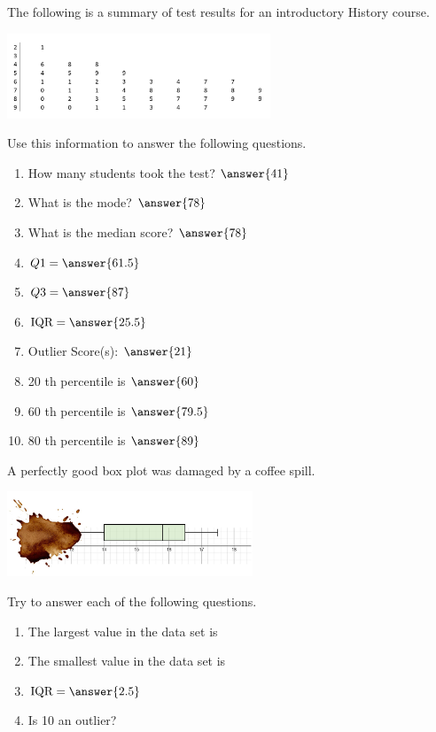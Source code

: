 \documentclass{ximera}
\begin{document}
\begin{problem}\label{prob:140hom2prob4}
The following is a summary of test results for an introductory History course.
\begin{image}
   \includegraphics[height=1in]{140H2pic10.jpg}
 \end{image}
 
 Use this information to answer the following questions.
 
 \begin{enumerate}
     \item How many students took the test? $\answer{41}$
     \item What is the mode? $\answer{78}$
     \item What is the median score? $\answer{78}$
     \item $Q1=\answer{61.5}$
     \item $Q3=\answer{87}$
     \item $\mbox{IQR}=\answer{25.5}$
     \item Outlier Score(s): $\answer{21}$
     \item 20 th percentile is $\answer{60}$
     \item 60 th percentile is $\answer{79.5}$
     \item 80 th percentile is $\answer{89}$
 \end{enumerate}
\end{problem}

\begin{problem}\label{prob:140hom2prob5}
A perfectly good box plot was damaged by a coffee spill.  
\begin{image}
   \includegraphics[height=1in]{140H2pic9.jpg}
 \end{image}
 Try to answer each of the following questions.
 \begin{enumerate}
     \item The largest value in the data set is 
     \item The smallest value in the data set is 
     \item $\mbox{IQR}=\answer{2.5}$
     \item Is 10 an outlier? 
 \end{enumerate}
 
 \end{problem}
\end{document}
